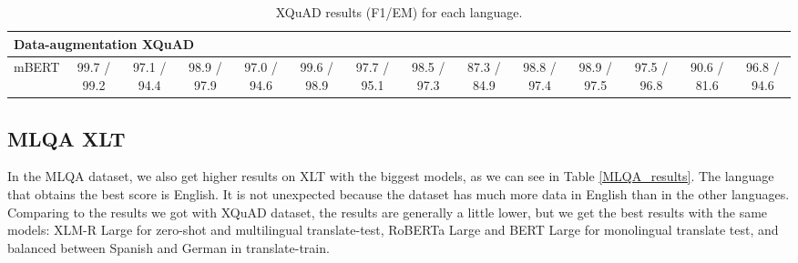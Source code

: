\documentclass[11pt]{article}
\begin{document}
\begin{table*}[!ht]
\begin{adjustbox}{max width=\textwidth}
\begin{tabular}{l|cccccccccccc|c}
        \midrule
        \multicolumn{14}{l}{Data-augmentation XQuAD} \\
        \midrule
        mBERT & 99.7 / 99.2 & 97.1 / 94.4 & 98.9 / 97.9 & 97.0 / 94.6 & 99.6 / 98.9 & 97.7 / 95.1 & 98.5 / 97.3 & 87.3 / 84.9 & 98.8 / 97.4 & 98.9 / 97.5 & 97.5 / 96.8 & 90.6 / 81.6 & 96.8 / 94.6 \\
        \bottomrule
    \end{tabular}
    \end{adjustbox}
    \centering
    \caption{XQuAD results (F1/EM) for each language.}
    \label{XQuAD_results}
\end{table*}

\subsection{MLQA XLT}

In the MLQA dataset, we also get higher results on XLT with the biggest models, as we can see in Table \ref{MLQA_results}. The language that obtains the best score is English. It is not unexpected because the dataset has much more data in English than in the other languages.
Comparing to the results we got with XQuAD dataset, the results are generally a little lower, but we get the best results with the same models: XLM-R Large for zero-shot and multilingual translate-test, RoBERTa Large and BERT Large for monolingual translate test, and balanced between Spanish and German in translate-train.
\end{document}
